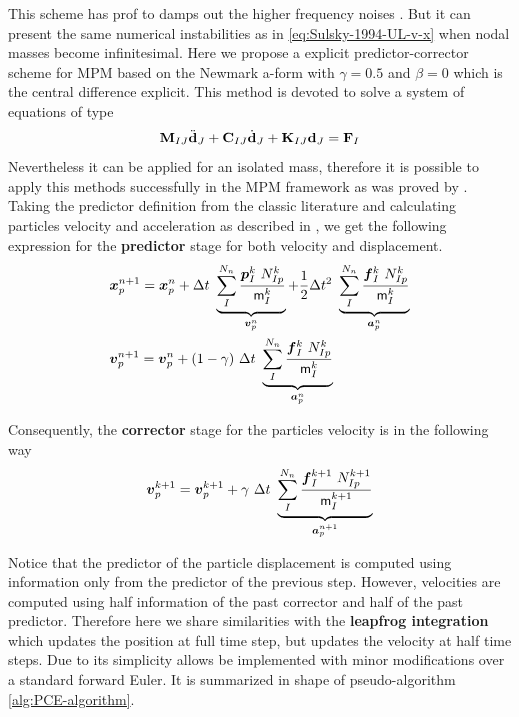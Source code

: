 This scheme has prof to damps out the higher frequency noises
\cite{Tran2019e}. But it can present the same numerical instabilities
as in \eqref{eq:Sulsky-1994-UL-v-x} when nodal masses become infinitesimal.
Here we propose a explicit predictor-corrector scheme for MPM based on the Newmark a-form with
$\gamma = 0.5$ and $\beta = 0$ which is the central difference
explicit. This method is devoted to solve a system of equations of type
\begin{equation*}
  \mathbf{{M}}_{IJ}\ddot{\mathbf{{d}}}_{J} + \mathbf{{C}}_{IJ}\dot{\mathbf{{d}}}_{J} +
  \mathbf{{K}}_{IJ}\mathbf{{d}}_{J} = \mathbf{{F}}_{I}
\end{equation*}
Nevertheless it can be applied for an isolated mass, therefore it is
possible to apply this methods successfully in the MPM framework as
was proved by \cite{Tran2019e}. Taking the predictor
definition from the classic literature \cite{Hughes2000} and
calculating particles velocity and acceleration as described in 
\cite{Zhang_book_2016}, we get the following expression for the
\textbf{predictor} stage for both velocity and displacement.
\begin{align}
  \label{eq:Predictor-displacement}
  &\vec{x}_p^{n+1} = \vec{x}_p^n + \Delta t\ \underbrace{\sum^{N_n}_{I}\frac{\vec{p}_{I}^{k}\ N_{Ip}^k}{\tens{m}_I^k}}_{\vec{v}_p^{n}} + \frac{1}{2}\Delta t^2\ \underbrace{\sum^{N_n}_{I}\frac{\vec{f}_{I}^{k}\ N_{Ip}^k}{\tens{m}_I^k}}_{\vec{a}_p^{n}}\\
  \label{eq:Predictor-velocity}
  &\vec{v}_p^{n+1} = \vec{v}_p^n + (1 - \gamma)\ \Delta t\ \underbrace{\sum^{N_n}_{I}\frac{\vec{f}_{I}^{k}\ N_{Ip}^k}{\tens{m}_I^k}}_{\vec{a}_p^{n}}        
\end{align}

Consequently, the \textbf{corrector} stage for the particles velocity is in the
following way
\begin{equation*}
  \vec{v}_{p}^{k+1} = \vec{v}_{p}^{k+1} +
  \gamma\ \Delta t\ \underbrace{\sum^{N_n}_{I}\frac{\vec{f}_{I}^{k+1}\ N_{Ip}^{k+1}}{\tens{m}_I^{k+1}}}_{\vec{a}_p^{n+1}}  
\end{equation*}

Notice that the predictor of the particle displacement is
computed using information only from the predictor of the
previous step. However, velocities are computed using half information
of the past corrector and half of the past predictor. Therefore here we share
similarities with the \textbf{leapfrog integration} which updates the
position at full time step, but updates the velocity at half time
steps. Due to its simplicity allows be implemented with minor modifications
over a standard forward Euler. It is summarized in shape of
pseudo-algorithm \ref{alg:PCE-algorithm}.

